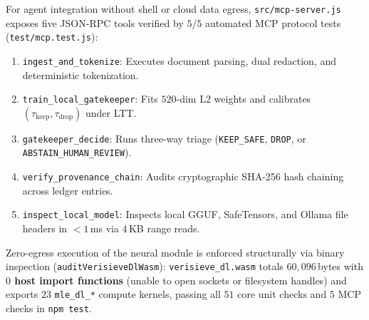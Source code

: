 \documentclass{article}
\begin{document}
For agent integration without shell or cloud data egress, \texttt{src/mcp-server.js} exposes five JSON-RPC tools verified by $5/5$ automated MCP protocol tests (\texttt{test/mcp.test.js}):
\begin{enumerate}
    \item \texttt{ingest\_and\_tokenize}: Executes document parsing, dual redaction, and deterministic tokenization.
    \item \texttt{train\_local\_gatekeeper}: Fits $520$-dim L2 weights and calibrates $(\tau_{\text{keep}}, \tau_{\text{drop}})$ under LTT.
    \item \texttt{gatekeeper\_decide}: Runs three-way triage (\texttt{KEEP\_SAFE}, \texttt{DROP}, or \texttt{ABSTAIN\_HUMAN\_REVIEW}).
    \item \texttt{verify\_provenance\_chain}: Audits cryptographic SHA-256 hash chaining across ledger entries.
    \item \texttt{inspect\_local\_model}: Inspects local GGUF, SafeTensors, and Ollama file headers in $<1$\,ms via $4$\,KB range reads.
\end{enumerate}

Zero-egress execution of the neural module is enforced structurally via binary inspection (\texttt{auditVerisieveDlWasm}): \texttt{verisieve\_dl.wasm} totals $60,096$\,bytes with \textbf{$0$ host import functions} (unable to open sockets or filesystem handles) and exports $23$ \texttt{mle\_dl\_*} compute kernels, passing all $51$ core unit checks and $5$ MCP checks in \texttt{npm test}.
\end{document}

